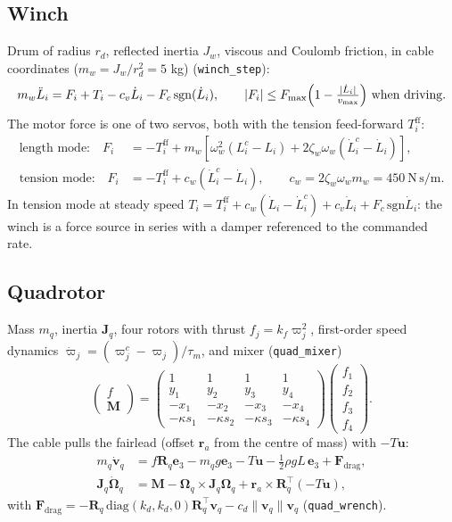 \documentclass[11pt,a4paper]{article}
\newcommand{\T}{^{\!\top}}
\newcommand{\e}{\bm{e}}
\begin{document}
\subsection{Winch}\label{sec:winch}
Drum of radius $r_d$, reflected inertia $J_w$, viscous and Coulomb friction, in cable coordinates
($m_w=J_w/r_d^2=5$ kg) (\texttt{winch\_step}):
\begin{equation}
 m_w\ddot L_i=F_i+T_i-c_v\dot L_i-F_c\,\mathrm{sgn}(\dot L_i),\qquad |F_i|\le F_{\max}\Bigl(1-\tfrac{|\dot L_i|}{v_{\max}}\Bigr)\ \text{when driving.}
\end{equation}
The motor force is one of two servos, both with the tension feed-forward $T^{\mathrm{ff}}_i$:
\begin{align}
 \text{length mode:}\quad F_i&=-T^{\mathrm{ff}}_i+m_w\!\left[\omega_w^2(L^c_i-L_i)+2\zeta_w\omega_w(\dot L^c_i-\dot L_i)\right], \label{eq:lenmode}\\
 \text{tension mode:}\quad F_i&=-T^{\mathrm{ff}}_i+c_w(\dot L^c_i-\dot L_i),\qquad c_w=2\zeta_w\omega_w m_w=450\ \mathrm{N\,s/m}. \label{eq:tenmode}
\end{align}
In tension mode at steady speed $T_i=T^{\mathrm{ff}}_i+c_w(\dot L_i-\dot L^c_i)+c_v\dot L_i+F_c\,\mathrm{sgn}\dot L_i$:
the winch is a force source in series with a damper referenced to the commanded rate.

\subsection{Quadrotor}\label{sec:quad}
Mass $m_q$, inertia $\bm J_q$, four rotors with thrust $f_j=k_f\varpi_j^2$, first-order speed dynamics
$\dot\varpi_j=(\varpi^c_j-\varpi_j)/\tau_m$, and mixer (\texttt{quad\_mixer})
\begin{equation}
\begin{pmatrix}f\\ \bm M\end{pmatrix}=\begin{pmatrix}1&1&1&1\\ y_1&y_2&y_3&y_4\\ -x_1&-x_2&-x_3&-x_4\\ -\kappa s_1&-\kappa s_2&-\kappa s_3&-\kappa s_4\end{pmatrix}\!\begin{pmatrix}f_1\\f_2\\f_3\\f_4\end{pmatrix}.
\end{equation}
The cable pulls the fairlead (offset $\bm r_a$ from the centre of mass) with $-T\bm u$:
\begin{align}
 m_q\dot{\bm v}_q&=f\bm R_q\e_3-m_qg\e_3-T\bm u-\tfrac12\rho gL\,\e_3+\bm F_{\mathrm{drag}}, \label{eq:quadtrans}\\
 \bm J_q\dot{\bm\Omega}_q&=\bm M-\bm\Omega_q\times\bm J_q\bm\Omega_q+\bm r_a\times\bm R_q\T(-T\bm u), \label{eq:quadrot}
\end{align}
with $\bm F_{\mathrm{drag}}=-\bm R_q\,\mathrm{diag}(k_d,k_d,0)\bm R_q\T\bm v_q-c_d\|\bm v_q\|\bm v_q$ (\texttt{quad\_wrench}).
\end{document}
